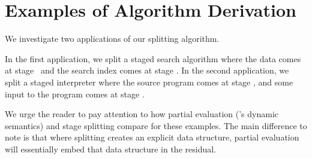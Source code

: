 

\section{Examples of Algorithm Derivation}
\label{sec:examples}

We investigate two applications of our splitting algorithm.

In the first application, we split a staged search algorithm where the data comes at stage \bbone\ and the search index comes at stage \bbtwo.  
In the second application, we split a staged interpreter where the source program comes at stage \bbone, and some input to the program comes at stage \bbtwo.
 
We urge the reader to pay attention to how partial evaluation (\lang's dynamic semantics) and stage splitting compare for these examples.
The main difference to note is that where splitting creates an explicit data structure, partial evaluation will
essentially embed that data structure in the residual. 

%
%
%
%
%
%

